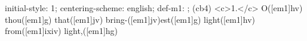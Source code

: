initial-style: 1;
centering-scheme: english;
def-m1: \grealign;
(cb4) <c>1.</c> O([em1]hv) thou([em1]g) that([em1]jv) bring-([em1]jv)est([em1]g) light([em1]hv) from([em1]ixiv) light,([em1]hg)